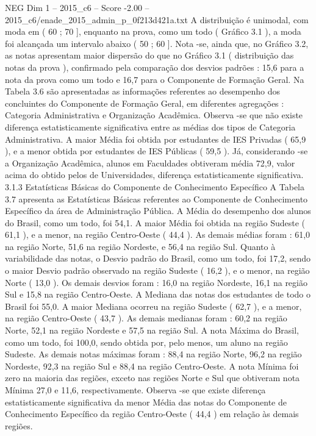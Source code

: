 \begin{textsample}{NEG Dim 1 – 2015\_c6 – Score -2.00 – 2015\_c6/enade\_2015\_admin\_p\_0f213d421a.txt}
A distribuição é unimodal, com moda em ( 60 ; 70 ], enquanto na prova, como um todo ( Gráfico 3.1 ), a moda foi alcançada um intervalo abaixo ( 50 ; 60 ].
Nota -se, ainda que, no Gráfico 3.2, as notas apresentam maior dispersão do que no Gráfico 3.1 ( distribuição das notas da prova ), confirmado pela comparação dos desvios padrões : 15,6 para a nota da prova como um todo e 16,7 para o Componente de Formação Geral.
Na Tabela 3.6 são apresentadas as informações referentes ao desempenho dos concluintes do Componente de Formação Geral, em diferentes agregações : Categoria Administrativa e Organização Acadêmica.
Observa -se que não existe diferença estatisticamente significativa entre as médias dos tipos de Categoria Administrativa.
A maior Média foi obtida por estudantes de IES Privadas ( 65,9 ), e a menor obtida por estudantes de IES Públicas ( 59,5 ).
Já, considerando -se a Organização Acadêmica, alunos em Faculdades obtiveram média 72,9, valor acima do obtido pelos de Universidades, diferença estatisticamente significativa. 3.1.3 Estatísticas Básicas do Componente de Conhecimento Específico A Tabela 3.7 apresenta as Estatísticas Básicas referentes ao Componente de Conhecimento Específico da área de Administração Pública.
A Média do desempenho dos alunos do Brasil, como um todo, foi 54,1.
A maior Média foi obtida na região Sudeste ( 61,1 ), e a menor, na região Centro-Oeste ( 44,4 ).
As demais médias foram : 61,0 na região Norte, 51,6 na região Nordeste, e 56,4 na região Sul.
Quanto à variabilidade das notas, o Desvio padrão do Brasil, como um todo, foi 17,2, sendo o maior Desvio padrão observado na região Sudeste ( 16,2 ), e o menor, na região Norte ( 13,0 ).
Os demais desvios foram : 16,0 na região Nordeste, 16,1 na região Sul e 15,8 na região Centro-Oeste.
A Mediana das notas dos estudantes de todo o Brasil foi 55,0.
A maior Mediana ocorreu na região Sudeste ( 62,7 ), e a menor, na região Centro-Oeste ( 43,7 ).
As demais medianas foram : 60,2 na região Norte, 52,1 na região Nordeste e 57,5 na região Sul.
A nota Máxima do Brasil, como um todo, foi 100,0, sendo obtida por, pelo menos, um aluno na região Sudeste.
As demais notas máximas foram : 88,4 na região Norte, 96,2 na região Nordeste, 92,3 na região Sul e 88,4 na região Centro-Oeste.
A nota Mínima foi zero na maioria das regiões, exceto nas regiões Norte e Sul que obtiveram nota Mínima 27,0 e 11,6, respectivamente.
Observa -se que existe diferença estatisticamente significativa da menor Média das notas do Componente de Conhecimento Específico da região Centro-Oeste ( 44,4 ) em relação às demais regiões.

\end{textsample}
